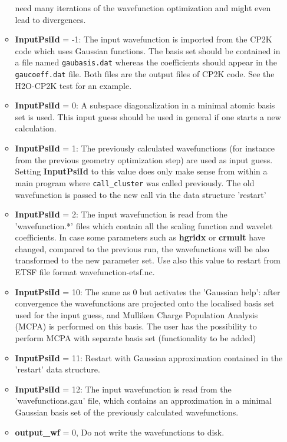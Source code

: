 \documentclass[a4paper,11pt]{report}
\begin{document}
\begin{itemize}
\begin{itemize}
            need many iterations of the wavefunction optimization and might even lead to divergences.
      \item {\bf InputPsiId } = -1: The input wavefunction is imported from the CP2K code which
            uses Gaussian functions. 
            The basis set should be contained in a file named \texttt{gaubasis.dat} 
            whereas the coefficients should appear in the \texttt{gaucoeff.dat} file. 
            Both files are the output files of CP2K code. See the H2O-CP2K test for an example.
      \item {\bf InputPsiId } = 0: A subspace diagonalization in a minimal atomic basis set is used.
            This input guess should be used in general if one starts a new calculation. 
      \item {\bf InputPsiId } = 1: The previously calculated wavefunctions (for instance from the previous 
            geometry optimization step) are used as input guess. Setting {\bf InputPsiId } to 
            this value does only make sense from within a main program where \texttt{call\_cluster} was 
            called previously. The old wavefunction is passed to the new call via the data structure 'restart'
      \item {\bf InputPsiId } = 2: The input wavefunction is read from the 'wavefunction.*' files which contain all the 
            scaling function and wavelet coefficients. In case some parameters such as {\bf hgridx} 
            or {\bf crmult} have changed, compared to the previous run, the wavefunctions will be 
            also transformed to the new parameter set. Use also this value to restart from ETSF file format wavefunction-etsf.nc.
      \item {\bf InputPsiId } = 10: The same as 0 but activates the 'Gaussian help': 
            after convergence the wavefunctions are projected onto the localised basis set used for
            the input guess, and Mulliken Charge Population Analysis (MCPA) is performed on this
            basis. The user has the possibility to perform MCPA with separate basis set (functionality to be added)
       \item {\bf InputPsiId } = 11: Restart with Gaussian approximation contained in the 'restart' data structure.
       \item {\bf InputPsiId } = 12: The input wavefunction is read from the 'wavefunctions.gau'  file, which contains an 
            approximation in a minimal Gaussian basis set of the previously calculated wavefunctions.
       \item {\bf output\_wf} = 0, Do not write the wavefunctions to disk.

\end{itemize}
\end{itemize}
\end{document}
